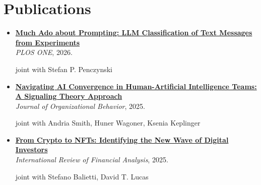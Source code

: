 \documentclass[letterpaper,11pt]{article}
\begin{document}
\vspace{0.25cm}

\section{Publications}
\begin{itemize}[leftmargin=0.15in, label=\textbullet, itemsep=5pt]

    \item[] \begin{minipage}{\linewidth}
        \href{https://doi.org/10.1371/journal.pone.0354757}{\small{\textbf{Much Ado about Prompting: LLM Classification of Text Messages from Experiments}}} \\
        \small{\textit{PLOS ONE}, 2026.}
        \par{\raggedleft\footnotesize{joint with Stefan P. Penczynski}\par}
    \end{minipage}

    \vspace{0.2cm}

    \item[] \begin{minipage}{\linewidth}
        \href{https://doi.org/10.1002/job.2856}{\small{\textbf{Navigating AI Convergence in Human-Artificial Intelligence Teams: A Signaling Theory Approach}}} \\
        \small{\textit{Journal of Organizational Behavior}, 2025.}
        \par{\raggedleft\footnotesize{joint with Andria Smith, Huner Wagoner, Ksenia Keplinger}\par}
    \end{minipage}

    \vspace{0.2cm}

   \item[] \begin{minipage}{\linewidth}
        \href{https://www.sciencedirect.com/science/article/pii/S1057521925002595}{\small{\textbf{From Crypto to NFTs: Identifying the New Wave of Digital Investors}} }\\
        \small{\textit{International Review of Financial Analysis}, 2025.}
        \par{\raggedleft\footnotesize{joint with Stefano Balietti, David T. Lucas}\par}
    \end{minipage}


\end{itemize}
\end{document}
